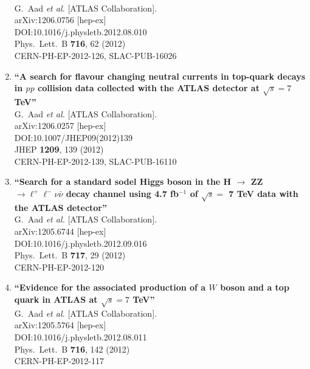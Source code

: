 \documentclass{article}
\begin{document}
\begin{enumerate}
  \\{}G.~Aad {\it et al.} [ATLAS Collaboration].
  \\{}arXiv:1206.0756 [hep-ex]
  \\{}DOI:10.1016/j.physletb.2012.08.010
  \\{}Phys.\ Lett.\ B {\bf 716}, 62 (2012)
  \\{}CERN-PH-EP-2012-126, SLAC-PUB-16026
\item%
{\bf ``A search for flavour changing neutral currents in top-quark decays in $pp$ collision data collected with the ATLAS detector at $\sqrt{s}=7$ TeV''}
  \\{}G.~Aad {\it et al.} [ATLAS Collaboration].
  \\{}arXiv:1206.0257 [hep-ex]
  \\{}DOI:10.1007/JHEP09(2012)139
  \\{}JHEP {\bf 1209}, 139 (2012)
  \\{}CERN-PH-EP-2012-139, SLAC-PUB-16110
\item%
{\bf ``Search for a standard sodel Higgs boson in the H $\to$ ZZ $\to \ell^{+}\ell^{-}\nu \bar{\nu}$ decay channel using 4.7 fb$^{-1}$ of $\sqrt{s} =$ 7 TeV data with the ATLAS detector''}
  \\{}G.~Aad {\it et al.} [ATLAS Collaboration].
  \\{}arXiv:1205.6744 [hep-ex]
  \\{}DOI:10.1016/j.physletb.2012.09.016
  \\{}Phys.\ Lett.\ B {\bf 717}, 29 (2012)
  \\{}CERN-PH-EP-2012-120
\item%
{\bf ``Evidence for the associated production of a $W$ boson and a top quark in ATLAS at $\sqrt{s}=7$ TeV''}
  \\{}G.~Aad {\it et al.} [ATLAS Collaboration].
  \\{}arXiv:1205.5764 [hep-ex]
  \\{}DOI:10.1016/j.physletb.2012.08.011
  \\{}Phys.\ Lett.\ B {\bf 716}, 142 (2012)
  \\{}CERN-PH-EP-2012-117

\end{enumerate}
\end{document}
